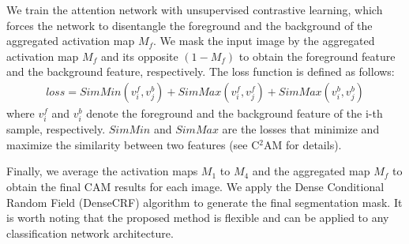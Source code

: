 We train the attention network with unsupervised contrastive learning, which forces the network to disentangle the foreground and the background of the aggregated activation map $M_f$. We mask the input image by the aggregated activation map $M_f$ and its opposite $(1-M_f)$ to obtain the foreground feature and the background feature, respectively. The loss function is defined as follows:
\begin{equation}
\label{eq.closs}
\begin{aligned}
loss = SimMin(v_i^f, v_j^b)+ SimMax(v_i^f, v_j^f) + SimMax(v_i^b, v_j^b)
\end{aligned}
\end{equation}
where $v_i^f$ and $v_i^b$ denote the foreground and the background feature of the i-th sample, respectively. $SimMin$ and $SimMax$ are the losses that minimize and maximize the similarity between two features (see C$^2$AM\cite{xie2022c2am} for details).

Finally, we average the activation maps $M_1$ to $M_4$ and the aggregated map $M_f$ to obtain the final CAM results for each image. We apply the Dense Conditional Random Field (DenseCRF)\cite{krahenbuhl2011efficient} algorithm to generate the final segmentation mask. It is worth noting that the proposed method is flexible and can be applied to any classification network architecture.


